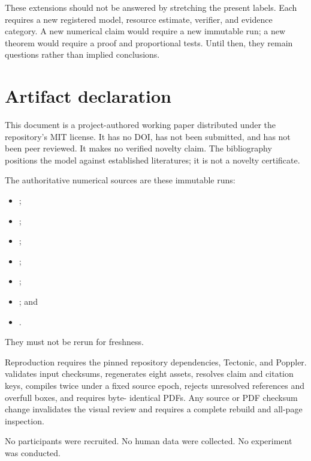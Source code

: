 \documentclass[11pt]{article}
\begin{document}
These extensions should not be answered by stretching the present labels. Each
requires a new registered model, resource estimate, verifier, and evidence
category. A new numerical claim would require a new immutable run; a new
theorem would require a proof and proportional tests. Until then, they remain
questions rather than implied conclusions.




\section*{Artifact declaration}

This document is a project-authored working paper distributed under the
repository's MIT license. It has no DOI, has not been submitted, and has not
been peer reviewed. It makes no verified novelty claim. The bibliography
positions the model against established literatures; it is not a novelty
certificate.

The authoritative numerical sources are these immutable runs:
\begin{itemize}[leftmargin=2em,itemsep=0pt,topsep=2pt]
\item {};
\item {};
\item {};
\item {};
\item {};
\item {}; and
\item {}.
\end{itemize}
They must not be rerun for freshness.

Reproduction requires the pinned repository dependencies, Tectonic, and
Poppler.  validates input checksums, regenerates eight
assets, resolves claim and citation keys, compiles twice under a fixed source
epoch, rejects unresolved references and overfull boxes, and requires byte-
identical PDFs. Any source or PDF checksum change invalidates the visual review
and requires a complete rebuild and all-page inspection.

No participants were recruited. No human data were collected. No experiment
was conducted.
\end{document}
